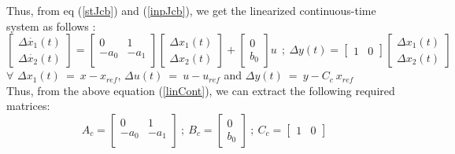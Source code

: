 \documentclass[a4paper,12pt]{article}
\begin{document}
Thus, from eq (\ref{stJcb}) and (\ref{inpJcb}), we get the linearized continuous-time system as follows :
	\begin{equation}
	\boxed{
		\begin{bmatrix}
  			\Delta \dot{x_1}(t) \\
			 \Delta \dot{x_2}(t)
		\end{bmatrix}
		=\begin{bmatrix}
 			0 & 1\\
			-a_0 & - a_1\\
		\end{bmatrix}
		\begin{bmatrix}
			\Delta x_1 (t) \\
			\Delta x_2 (t)
		\end{bmatrix}
		+\begin{bmatrix}
			0\\
			b_0 
		\end{bmatrix}
		u \  \ ; \
		\Delta y(t) = \begin{bmatrix}
			1 & 0
		\end{bmatrix}
		\begin{bmatrix}
			\Delta x_1 (t) \\
			\Delta x_2 (t)
		\end{bmatrix} }
\label{linCont}
	\end{equation}
	$\forall$ $\Delta x_1(t) \ = \ x - x_{ref}$, $\Delta u(t) \ = \ u - u_{ref}$ and $\Delta y(t) \ = \ y - C_c \ x_{ref}$ \\
Thus, from the above equation (\ref{linCont}), we can extract the following required matrices:
	\begin{equation}
	\boxed{
		A_c = \begin{bmatrix}
			0 & 1\\
			-a_0 & - a_1\\
		\end{bmatrix}
	\ ; \ B_c = \begin{bmatrix}
			0\\
			b_0
		\end{bmatrix}
	\ ; \ C_c = \begin{bmatrix}
			1 & 0
		\end{bmatrix}}
	\end{equation}
	
\end{document}
